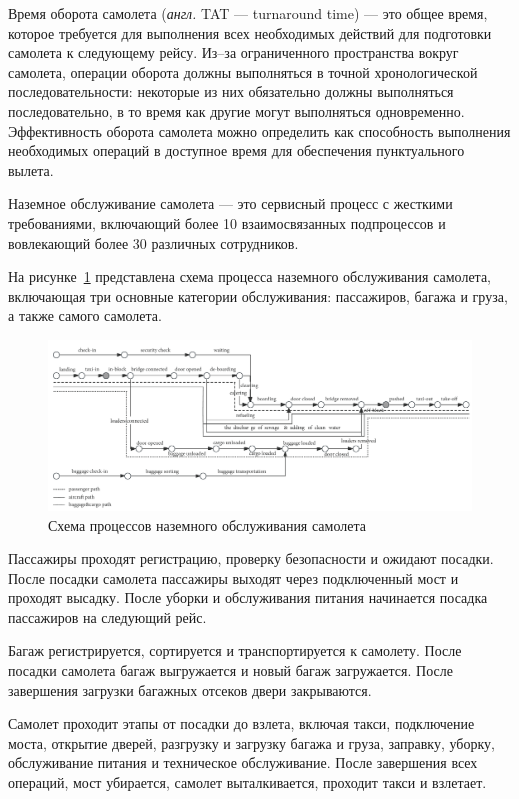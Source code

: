 Время оборота самолета (\textit{англ.} TAT --- turnaround time) --- это общее время, которое требуется для выполнения всех необходимых действий для подготовки самолета к следующему рейсу.
Из--за ограниченного пространства вокруг самолета, операции оборота должны выполняться в точной хронологической последовательности: некоторые из них обязательно должны выполняться последовательно, в то время как другие могут выполняться одновременно.
Эффективность оборота самолета можно определить как способность выполнения необходимых операций в доступное время для обеспечения пунктуального вылета.

Наземное обслуживание самолета --- это сервисный процесс с жесткими требованиями, включающий более 10 взаимосвязанных подпроцессов и вовлекающий более 30 различных сотрудников.

На рисунке~\ref{fig:tat} представлена схема процесса наземного обслуживания самолета, включающая три основные категории обслуживания: пассажиров, багажа и груза, а также самого самолета.

\begin{figure}[h]
    \centering
    \includegraphics[scale=0.25]{inc/tat}
    \caption{Схема процессов наземного обслуживания самолета}
    \label{fig:tat}
\end{figure}

Пассажиры проходят регистрацию, проверку безопасности и ожидают посадки.
После посадки самолета пассажиры выходят через подключенный мост и проходят высадку.
После уборки и обслуживания питания начинается посадка пассажиров на следующий рейс.

Багаж регистрируется, сортируется и транспортируется к самолету.
После посадки самолета багаж выгружается и новый багаж загружается.
После завершения загрузки багажных отсеков двери закрываются.

Самолет проходит этапы от посадки до взлета, включая такси, подключение моста, открытие дверей, разгрузку и загрузку багажа и груза, заправку, уборку, обслуживание питания и техническое обслуживание.
После завершения всех операций, мост убирается, самолет выталкивается, проходит такси и взлетает.


